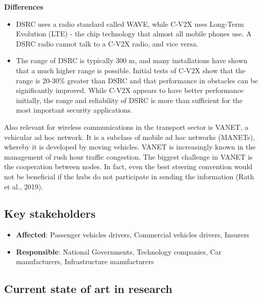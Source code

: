 \documentclass[
]{book}
\providecommand{\tightlist}{%
  \setlength{\itemsep}{0pt}\setlength{\parskip}{0pt}}
\begin{document}
\textbf{Differences}

\begin{itemize}
\tightlist
\item
  DSRC uses a radio standard called WAVE, while C-V2X uses Long-Term Evolution (LTE) - the chip technology that almost all mobile phones use. A DSRC radio cannot talk to a C-V2X radio, and vice versa.
\item
  The range of DSRC is typically 300 m, and many installations have shown that a much higher range is possible. Initial tests of C-V2X show that the range is 20-30\% greater than DSRC and that performance in obstacles can be significantly improved. While C-V2X appears to have better performance initially, the range and reliability of DSRC is more than sufficient for the most important security applications.
\end{itemize}

Also relevant for wireless communications in the transport sector is VANET, a vehicular ad hoc network. It is a subclass of mobile ad hoc networks (MANETs), whereby it is developed by moving vehicles. VANET is increasingly known in the management of rush hour traffic congestion. The biggest challenge in VANET is the cooperation between nodes. In fact, even the best steering convention would not be beneficial if the hubs do not participate in sending the information (Rath et al., 2019).

\hypertarget{key-stakeholders-41}{%
\subsection*{Key stakeholders}\label{key-stakeholders-41}}

\begin{itemize}
\tightlist
\item
  \textbf{Affected}: Passenger vehicles drivers, Commercial vehicles drivers, Insurers
\item
  \textbf{Responsible}: National Governments, Technology companies, Car manufacturers, Infrastructure manufacturers
\end{itemize}

\hypertarget{current-state-of-art-in-research-41}{%
\subsection*{Current state of art in research}\label{current-state-of-art-in-research-41}}
\end{document}
